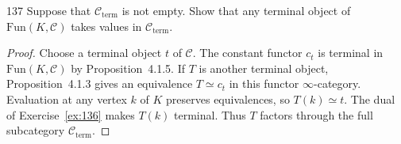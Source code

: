 \begin{exercise}{137}
\begingroup
\setlength{\emergencystretch}{2em}
Suppose that $\mathcal C_{\mathrm{term}}$ is not empty. Show that any terminal object of $\mathrm{Fun}(K,\mathcal C)$
takes values in $\mathcal C_{\mathrm{term}}$.
\par
\endgroup

\begin{proof}
Choose a terminal object $t$ of $\mathcal C$.
The constant functor $c_t$ is terminal in $\mathrm{Fun}(K,\mathcal C)$
by Proposition~4.1.5.
If $T$ is another terminal object, Proposition~4.1.3 gives an equivalence
$T\simeq c_t$ in this functor $\infty$-category.
Evaluation at any vertex $k$ of $K$ preserves equivalences, so
$T(k)\simeq t$.
The dual of Exercise~\ref{ex:136} makes $T(k)$ terminal.
Thus $T$ factors through the full subcategory $\mathcal C_{\mathrm{term}}$.
\end{proof}
\end{exercise}
